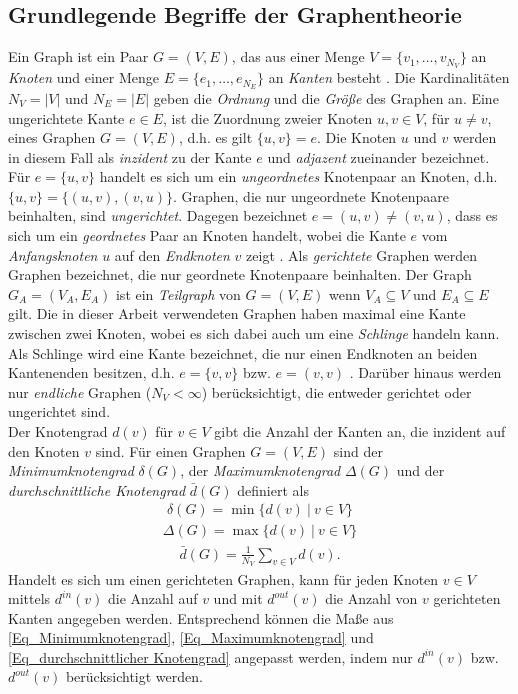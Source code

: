 \documentclass[12pt, a4paper]{report}\usepackage[]{graphicx}\usepackage[]{color}
\begin{document}
\subsection{Grundlegende Begriffe der Graphentheorie}\label{Kap_Grundlegende Begriffe der Graphentheorie}
Ein Graph ist ein Paar $G=(V,E)$, das aus einer Menge $V=\{v_1,\dots,v_{N_V}\}$ an \textit{Knoten} und einer Menge $E=\{e_1,\dots,e_{N_E}\}$ an \textit{Kanten} besteht \cite{brandes2005graphfunda}. Die Kardinalitäten $N_V =|V|$ und $N_E=|E|$ geben die \textit{Ordnung} und die \textit{Größe} des Graphen an. Eine ungerichtete Kante $e \in E$, ist die Zuordnung zweier Knoten $u,v \in V$, für $u \neq v$, eines Graphen $G=(V,E)$, d.h. es gilt $\{u,v\} = e$. Die Knoten $u$ und $v$ werden in diesem Fall als \textit{inzident} zu der Kante $e$ und \textit{adjazent} zueinander bezeichnet. Für $e=\{u,v\}$ handelt es sich um ein \textit{ungeordnetes} Knotenpaar an Knoten, d.h. $\{u,v\}=\{(u,v),(v,u)\}$. Graphen, die nur ungeordnete Knotenpaare beinhalten, sind \textit{ungerichtet}. Dagegen bezeichnet $e=(u,v) \neq (v,u)$, dass es sich um ein \textit{geordnetes} Paar an Knoten handelt, wobei die Kante $e$ vom \textit{Anfangsknoten} $u$ auf den \textit{Endknoten} $v$ zeigt \cite{kolaczyk2009statistical}. Als \textit{gerichtete} Graphen werden Graphen bezeichnet, die nur geordnete Knotenpaare beinhalten. Der Graph $G_A=(V_A,E_A)$ ist ein \textit{Teilgraph} von $G=(V,E)$ wenn $V_A \subseteq V$ und $E_A \subseteq E$ gilt. Die in dieser Arbeit verwendeten Graphen haben maximal eine Kante zwischen zwei Knoten, wobei es sich dabei auch um eine \textit{Schlinge} handeln kann. Als Schlinge wird eine Kante bezeichnet, die nur einen Endknoten an beiden Kantenenden besitzen, d.h. $e=\{v,v\}$ bzw. $e=(v,v)$ \cite{tittmann2011graphen}. Darüber hinaus werden nur \textit{endliche} Graphen ($N_V < \infty$) berücksichtigt, die entweder gerichtet oder ungerichtet sind.\\

Der Knotengrad $d(v)$ für $v \in V$ gibt die Anzahl der Kanten an, die inzident auf den Knoten $v$ sind. Für einen Graphen $G=(V,E)$ sind der \textit{Minimumknotengrad} $\delta(G)$, der \textit{Maximumknotengrad} $\Delta(G)$ und der \textit{durchschnittliche Knotengrad} $\bar{d}(G)$ definiert \cite{diestel2006graph} als
\begin{align}
\delta(G)=\min\{d(v) \ | \ v \in V\}\label{Eq_Minimumknotengrad}
\end{align}
\begin{align}
\Delta(G)=\max\{d(v) \ | \ v \in V\}\label{Eq_Maximumknotengrad}
\end{align}
\begin{align}
\bar{d}(G)=\frac{1}{N_V}\sum_{v \in V}d(v).\label{Eq_durchschnittlicher Knotengrad}
\end{align}
Handelt es sich um einen gerichteten Graphen, kann für jeden Knoten $v \in V$ mittels $d^{in}(v)$ die Anzahl auf $v$ und mit $d^{out}(v)$ die Anzahl von $v$ gerichteten Kanten angegeben werden. Entsprechend können die Maße aus \eqref{Eq_Minimumknotengrad}, \eqref{Eq_Maximumknotengrad} und \eqref{Eq_durchschnittlicher Knotengrad} angepasst werden, indem nur $d^{in}(v)$ bzw. $d^{out}(v)$ berücksichtigt werden.\\
\end{document}
